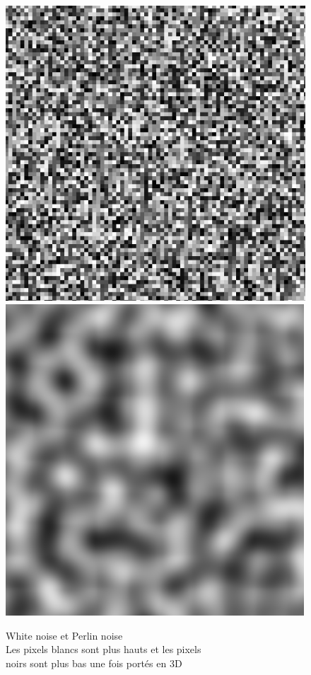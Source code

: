\documentclass{EPUProjetDi}
\begin{document}
\begin{figure}[H]
	\centering
	\captionsetup{justification=centering}
	\includegraphics[scale=.49]{white_noise}
	\includegraphics[scale=.49]{perlin_noise}
	\caption[White noise et Perlin noise]{White noise et Perlin noise\\Les pixels blancs sont plus hauts et les pixels\\ noirs sont plus bas une fois portés en 3D}
	\label{fig:noises}
\end{figure}
\end{document}
